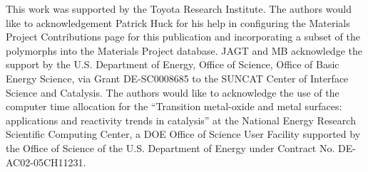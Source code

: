 

This work was supported by the Toyota Research Institute.
%
The authors would like to acknowledgement Patrick Huck for his help in configuring the Materials Project Contributions page for this publication and incorporating a subset of the \IrOx polymorphs into the Materials Project database.
%
JAGT and MB acknowledge the support by the U.S. Department of Energy, Office
of Science, Office of Basic Energy Science, via Grant DE-SC0008685 to the
SUNCAT Center of Interface Science and Catalysis.
%
The authors would like to acknowledge the use of the computer time allocation
for the “Transition metal-oxide and metal surfaces: applications and
reactivity trends in catalysis” at the National Energy Research Scientific
Computing Center, a DOE Office of Science User Facility supported by the
Office of Science of the U.S. Department of Energy under Contract No.
DE-AC02-05CH11231.
